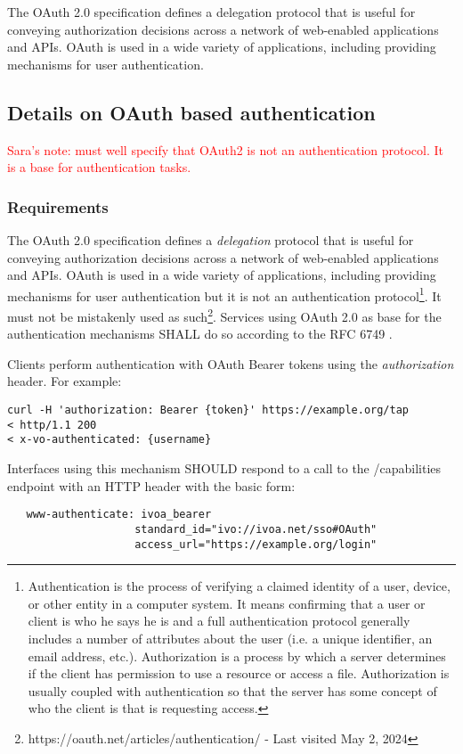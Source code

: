 \documentclass[11pt,a4paper]{ivoa}
\begin{document}
The OAuth 2.0 specification defines a delegation protocol that is
useful for conveying authorization decisions across a network of
web-enabled applications and APIs. OAuth is used in a wide variety
of applications, including providing mechanisms for user authentication.

\subsection{Details on OAuth based authentication}
\textcolor{red}{Sara's note: must well specify that OAuth2 is not an
authentication protocol. It is a base for authentication tasks.}
\subsubsection{Requirements}
The OAuth 2.0 specification defines a \emph{delegation}
protocol that is useful for conveying authorization decisions across a
network of web-enabled applications and APIs. OAuth is used in a wide
variety of applications, including providing mechanisms for user
authentication but it is not an authentication protocol\footnote{
Authentication is the process of verifying a claimed identity of a
user, device, or other entity in a computer system.  It means
confirming that a user or client is who he says he is and a full
authentication protocol generally includes a number of attributes
about the user (i.e. a unique identifier, an email address, etc.).
Authorization is a process by which a server determines if the client
has permission to use a resource or access a file. Authorization is
usually coupled with authentication so that the server has some concept
of who the client is that is requesting access.}. It must not be
mistakenly used as
such\footnote{https://oauth.net/articles/authentication/ - Last visited
May 2, 2024}.
Services using OAuth 2.0 as base for the authentication mechanisms SHALL
do so according to the RFC 6749 \citep{std:RFC6749}.

Clients perform authentication with OAuth Bearer tokens using the
\emph{authorization} header. For example:

\begin{verbatim}
curl -H 'authorization: Bearer {token}' https://example.org/tap
< http/1.1 200
< x-vo-authenticated: {username}
\end{verbatim}

Interfaces using this mechanism SHOULD respond to a call to the
/capabilities endpoint with an HTTP header with the basic form:
\begin{verbatim}
   www-authenticate: ivoa_bearer
                    standard_id="ivo://ivoa.net/sso#OAuth"
                    access_url="https://example.org/login"
\end{verbatim}
\end{document}
